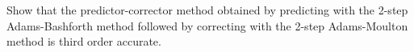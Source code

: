 Show that the predictor-corrector method obtained by predicting with the 2-step Adams-Bashforth method followed by
correcting with the 2-step Adams-Moulton method is third order accurate.

\begin{solution}\ \\\\
    \ \\
\end{solution}